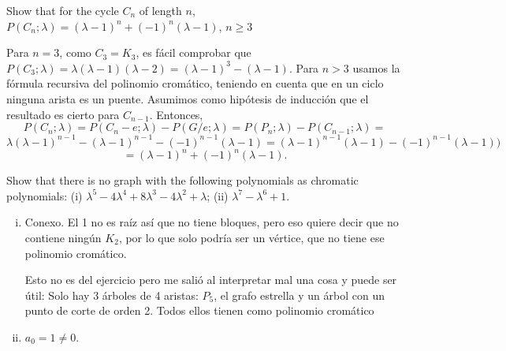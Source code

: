\documentclass[twoside]{article}
\begin{document}
\newpage

\begin{ejercicio}{3.6}
Show that for the cycle $C_n$ of length $n$, $P(C_n; λ) = (λ − 1)^n + (−1)^n
(λ − 1)$, $n ≥ 3$
\end{ejercicio}
\begin{solucion}
Para $n=3$, como $C_3=K_3$, es fácil comprobar que $P(C_3;\lambda)=\lambda(\lambda-1)(\lambda-2)=(λ − 1)^3 −(λ − 1)$. Para $n>3$ usamos la fórmula recursiva del polinomio cromático, teniendo en cuenta que en un ciclo ninguna arista es un puente. Asumimos como hipótesis de inducción que el resultado es cierto para $C_{n-1}$. Entonces, 
\[
P(C_n;\lambda)=P(C_n-e;\lambda)-P(G/e;\lambda)=P(P_n;\lambda)-P(C_{n-1};\lambda)=
\]
\[
\lambda(\lambda-1)^{n-1}-(λ − 1)^{n-1} - (−1)^{n-1}(λ − 1)=(λ − 1)^{n-1}(\lambda-1)-(−1)^{n-1}(λ − 1))
\]
\[
=(λ − 1)^n+(−1)^n(λ − 1).
\]


%
\end{solucion}

\newpage

\begin{ejercicio}{3.7}
Show that there is no graph with the following polynomials as chromatic polynomials:
(i) $λ^5 − 4λ^4 + 8λ^3 − 4λ^2 + λ$; (ii) $λ^7 − λ^6 + 1$.
\end{ejercicio}
\begin{solucion}
\begin{enumerate}[(i)]
\item Conexo. El 1 no es raíz así que no tiene bloques, pero eso quiere decir que no contiene ningún $K_2$, por lo que solo podría ser un vértice, que no tiene ese polinomio cromático. 

Esto no es del ejercicio pero me salió al interpretar mal una cosa y puede ser útil: Solo hay 3 árboles de 4 aristas: $P_5$, el grafo estrella y un árbol con un punto de corte de orden 2. Todos ellos tienen como polinomio cromático
\item $a_0=1\neq 0$. 
\end{enumerate}
\end{solucion}

\newpage
\end{document}
